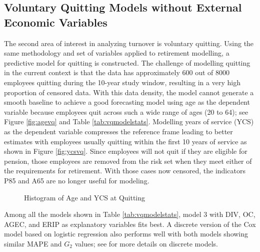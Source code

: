 \subsection{Voluntary Quitting Models without External Economic Variables} \label{VQ:woE}


The second area of interest in analyzing turnover is voluntary quitting. Using the same methodology and set of variables applied to retirement modelling, a predictive model for quitting is constructed.  The challenge of modelling quitting in the current context is that the data has approximately 600 out of 8000 employees quitting during the 10-year study window, resulting in a very high proportion of censored data. With this data density, the model cannot generate a smooth baseline to achieve a good forecasting model using age as the dependent variable because employees quit across such a wide range of ages (20 to 64); see Figure \ref{fig:agevq} and Table \ref{tab:vqmodelstats}. Modelling years of service (YCS) as the dependent variable compresses the reference frame leading to better estimates with employees usually quitting within the first 10 years of service as shown in Figure \ref{fig:ycsvq}. Since employees will not quit if they are eligible for pension, those employees are removed from the risk set when they meet either of the requirements for retirement. With those cases now censored, the indicators P85 and A65 are no longer useful for modeling.
\begin{figure}[h!]
	\centering
	\caption{Histogram of Age and YCS at Quitting}
	\label{fig:vqhist}
\end{figure}
Among all the models shown in Table \ref{tab:vqmodelstats}, model 3 with DIV, OC, AGEC, and ERIP as explanatory variables fits best.  A discrete version of the Cox model based on logistic regression also performs well with both models showing similar MAPE and $G_2$ values; see \citet{allison2010} for more details on discrete models.

